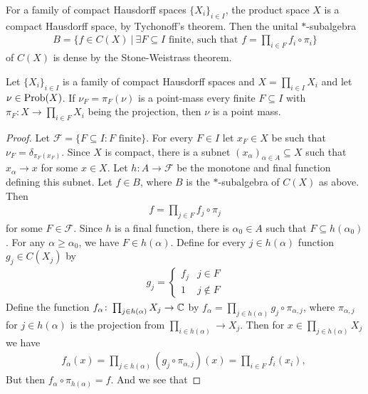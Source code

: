 \noindent For a family of compact Hausdorff spaces $\{X_{i}\}_{i \in I}$, the product space $\displaystyle X$ is a compact Hausdorff space, by Tychonoff's theorem. Then the unital $*$-subalgebra
\begin{align*}
B=\{f \in C(X)\ |\ \exists F\subseteq I \text{ finite, such that } f=\prod_{i \in F}f_{i} \circ \pi_{i}\}
\end{align*}
of $C(X)$ is dense by the Stone-Weistrass theorem. 

\begin{lemma}
Let $\{X_{i}\}_{i \in I}$ is a family of compact Hausdorff spaces and $X=\prod_{i \in I} X_{i}$ and let $\nu \in \operatorname{Prob}(X)$. If $\nu_F=\pi_F(\nu)$ is a point-mass every finite $F \subseteq I$ with $\pi_F \colon X \to \prod_{i \in F} X_{i}$ being the projection, then $\nu$ is a point mass.
\begin{proof}
Let $\mathcal{F}=\{F \subseteq I \colon F \text{ finite}\}$. For every $F \in I$ let $x_{F} \in X$ be such that $\nu_F=\delta_{\pi_F(x_F)}$. Since $X$ is compact, there is a subnet $(x_{\alpha})_{\alpha \in A} \subseteq X$ such that $x_{\alpha} \to x$ for some $x \in X$. Let $h \colon A \to \mathcal{F}$ be the monotone and final function defining this subnet. Let $f \in B$, where $B$ is the $*$-subalgebra of $C(X)$ as above. Then 
\begin{align*}
f=\prod_{j \in F} f_{j} \circ \pi_{j}
\end{align*}
for some $F \in \mathcal{F}$. Since $h$ is a final function, there is $\alpha_0 \in A$ such that $F \subseteq h(\alpha_0)$. For any $\alpha \geq \alpha_0$, we have $F \in h(\alpha)$. Define for every $j \in h(\alpha)$ function $g_j \in C(X_{j})$ by
\begin{align*}
g_j=\begin{cases}
f_j & j \in F\\
1 & j \not\in F
\end{cases}
\end{align*}
Define the function $f_{\alpha} \colon \prod_{j \in h(\alpha)} X_j \to \mathbb{C}$ by $f_{\alpha} = \prod_{j \in h(\alpha)} g_{j} \circ \pi_{\alpha,j}$, where $\pi_{\alpha,j}$ for $j \in h(\alpha)$ is the projection from $\prod_{i \in h(\alpha)} \to X_{j}$. Then for $x \in \prod_{j \in h(\alpha)} X_{j}$ we have
\begin{align*}
f_{\alpha}(x) = \prod_{j \in h(\alpha)} (g_{j} \circ \pi_{\alpha,j})(x)= \prod_{i \in F} f_{i}(x_{i}),\ 
\end{align*} 
But then $f_{\alpha} \circ \pi_{h(\alpha)}=f$. And we see that

\end{proof}
\end{lemma}
